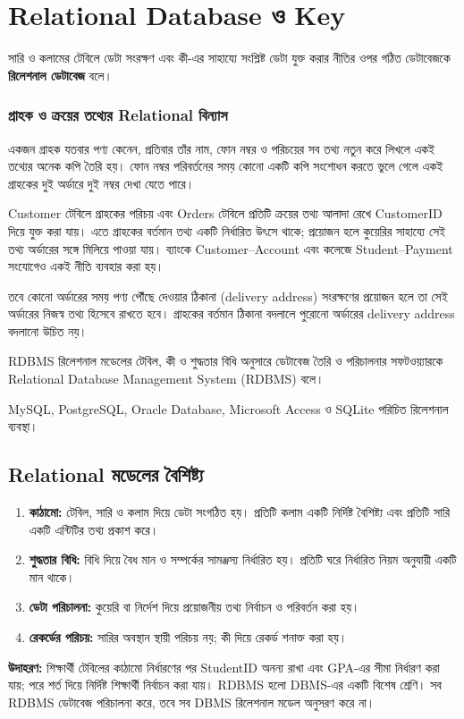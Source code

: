 \section{Relational Database ও Key}

\begin{definitionbox}{}
সারি ও কলামের টেবিলে ডেটা সংরক্ষণ এবং কী-এর সাহায্যে সংশ্লিষ্ট ডেটা যুক্ত করার নীতির ওপর গঠিত ডেটাবেজকে \textbf{রিলেশনাল ডেটাবেজ} বলে।
\end{definitionbox}


\subsubsection{গ্রাহক ও ক্রয়ের তথ্যের Relational বিন্যাস}
একজন গ্রাহক যতবার পণ্য কেনেন, প্রতিবার তাঁর নাম, ফোন নম্বর ও পরিচয়ের সব তথ্য নতুন করে লিখলে
একই তথ্যের অনেক কপি তৈরি হয়। ফোন নম্বর পরিবর্তনের সময় কোনো একটি কপি সংশোধন করতে ভুলে গেলে
একই গ্রাহকের দুই অর্ডারে দুই নম্বর দেখা যেতে পারে।

Customer টেবিলে গ্রাহকের পরিচয় এবং Orders টেবিলে প্রতিটি ক্রয়ের তথ্য আলাদা রেখে CustomerID দিয়ে যুক্ত করা যায়।
এতে গ্রাহকের বর্তমান তথ্য একটি নির্ধারিত উৎসে থাকে; প্রয়োজন হলে কুয়েরির সাহায্যে সেই তথ্য অর্ডারের সঙ্গে
মিলিয়ে পাওয়া যায়। ব্যাংকে Customer--Account এবং কলেজে Student--Payment সংযোগেও একই নীতি ব্যবহার করা হয়।

তবে কোনো অর্ডারের সময় পণ্য পৌঁছে দেওয়ার ঠিকানা (delivery address) সংরক্ষণের প্রয়োজন হলে তা সেই অর্ডারের
নিজস্ব তথ্য হিসেবে রাখতে হবে। গ্রাহকের বর্তমান ঠিকানা বদলালে পুরোনো অর্ডারের delivery address বদলানো উচিত নয়।


\begin{definitionbox}{RDBMS}
রিলেশনাল মডেলের টেবিল, কী ও শুদ্ধতার বিধি অনুসারে ডেটাবেজ তৈরি ও পরিচালনার সফটওয়্যারকে Relational Database Management System (RDBMS) বলে।
\end{definitionbox}
MySQL, PostgreSQL, Oracle Database, Microsoft Access ও SQLite পরিচিত রিলেশনাল ব্যবস্থা।

\subsection{Relational মডেলের বৈশিষ্ট্য}
\begin{enumerate}
\item \textbf{কাঠামো:} টেবিল, সারি ও কলাম দিয়ে ডেটা সংগঠিত হয়। প্রতিটি কলাম একটি নির্দিষ্ট বৈশিষ্ট্য এবং প্রতিটি সারি একটি এন্টিটির তথ্য প্রকাশ করে।
\item \textbf{শুদ্ধতার বিধি:} বিধি দিয়ে বৈধ মান ও সম্পর্কের সামঞ্জস্য নির্ধারিত হয়। প্রতিটি ঘরে নির্ধারিত নিয়ম অনুযায়ী একটি মান থাকে।
\item \textbf{ডেটা পরিচালনা:} কুয়েরি বা নির্দেশ দিয়ে প্রয়োজনীয় তথ্য নির্বাচন ও পরিবর্তন করা হয়।
\item \textbf{রেকর্ডের পরিচয়:} সারির অবস্থান স্থায়ী পরিচয় নয়; কী দিয়ে রেকর্ড শনাক্ত করা হয়।
\end{enumerate}
\textbf{উদাহরণ:} শিক্ষার্থী টেবিলের কাঠামো নির্ধারণের পর StudentID অনন্য রাখা এবং GPA-এর সীমা নির্ধারণ করা যায়; পরে শর্ত দিয়ে নির্দিষ্ট শিক্ষার্থী নির্বাচন করা যায়।
RDBMS হলো DBMS-এর একটি বিশেষ শ্রেণি। সব RDBMS ডেটাবেজ পরিচালনা করে, তবে সব DBMS রিলেশনাল মডেল অনুসরণ করে না।


